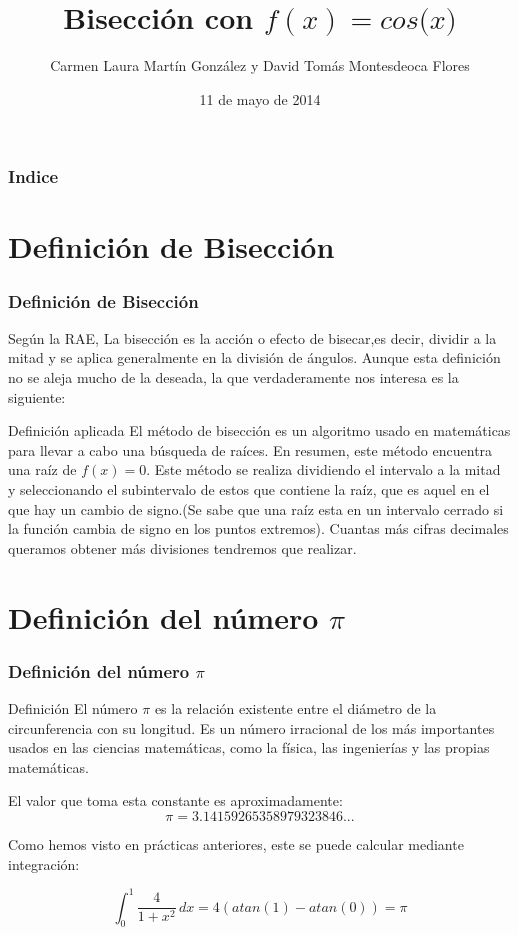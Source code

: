 \documentclass{beamer}
\title[La bisección de $f(x)=cos($\pi$x)$ en \textsc{Beamer}]{Bisección con $f(x)=cos($\pi$x)$}
\author[D. Montesdeoca y  L. Martín]{Carmen Laura Martín González
y
David Tomás Montesdeoca Flores}
\date[11/05/14]{11 de mayo de 2014}
\begin{document}
\begin{frame}
\titlepage
\end{frame}

\begin{frame}
\frametitle{Indice}
\tableofcontents[pausesections]

\end{frame}

\section{Definición de Bisección}

\begin{frame}
\frametitle{Definición de Bisección}

Según la RAE, La bisección es la acción o efecto de bisecar,es decir, dividir a la mitad y se aplica generalmente en la división de ángulos. Aunque esta definición no se aleja mucho de la deseada, la que verdaderamente nos interesa es la siguiente:

\begin{block}{Definición aplicada}
El método de bisección es un algoritmo usado en matemáticas para llevar a cabo una búsqueda de raíces. En resumen, este método encuentra una raíz de $f(x)=0$. Este método se realiza dividiendo el intervalo a la mitad y seleccionando el subintervalo de estos que contiene la raíz, que es aquel en el que hay un cambio de signo.(Se sabe que una raíz esta en un intervalo cerrado si la función cambia de signo en los puntos extremos). Cuantas más cifras decimales queramos obtener más divisiones tendremos que realizar.
\end{block} 

\end{frame}

\section{Definición del número $\pi$}

\begin{frame}
\frametitle{Definición del número $\pi$}
\begin{block}{Definición}
El número $\pi$ es la relación existente entre el diámetro de la circunferencia con su longitud.
Es un número irracional de los más importantes usados en las ciencias matemáticas, como la física, las ingenierías y las propias matemáticas.

El valor que toma esta constante es aproximadamente:
 $$\pi = 3.14159265358979323846...$$
\end{block}
Como hemos visto en prácticas anteriores, este se puede calcular mediante integración:

$$\int_{0}^{1} \! \frac{4}{1+x^2}\, dx = 4(atan(1) -atan(0)) = \pi $$

\end{frame}
\end{document}
